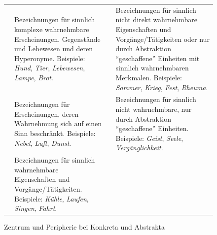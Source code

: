 \begin{figure}[h]
\begin{center}
\baselineskip
{\footnotesize\begin{tabularx}{\textwidth}{@{}lQlQ@{}}
 & Bezeichnungen für sinnlich komplexe wahrnehmbare Erscheinungen. Gegenstände und Lebewesen und deren Hyperonyme. Beispiele: \textit{Hund}, \textit{Tier}, \textit{Lebewesen}, \textit{Lampe}, \textit{Brot}.
&  & Bezeichnungen für sinnlich nicht direkt wahrnehmbare Eigenschaften und Vorgänge\slash Tätigkeiten oder nur durch Abstraktion "`geschaffene"' Einheiten mit sinnlich wahrnehmbaren Merkmalen. Beispiele: \textit{Sommer}, \textit{Krieg}, \textit{Fest}, \textit{Rheuma}.\\
 & Bezeichnungen für Erscheinungen, deren Wahrnehmung sich auf einen Sinn beschränkt. Beispiele: \textit{Nebel}, \textit{Luft}, \textit{Dunst}.
&  & Bezeichnungen für sinnlich nicht wahrnehmbare, nur durch Abstraktion "`geschaffene"' Einheiten. Beispiele: \textit{Geist}, \textit{Seele}, \textit{Vergänglichkeit}.\\
 & Bezeichnungen für sinnlich wahrnehmbare Eigenschaften und Vorgänge\slash Tätigkeiten. Beispiele: \textit{Kühle}, \textit{Laufen}, \textit{Singen}, \textit{Fahrt}.
\end{tabularx}}
\caption {Zentrum und Peripherie bei Konkreta und Abstrakta \parencite[41]{Schrauf2011}}
\label{abb:schrauf-ewald}
\end{center}
\end{figure}


